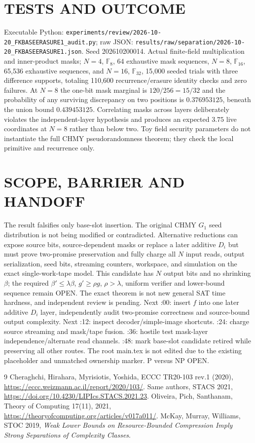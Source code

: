 \documentclass[11pt]{article}
\begin{document}
\section*{TESTS AND OUTCOME}
Executable Python: \texttt{experiments/review/2026-10-20\_FKBASEERASURE1\_audit.py}; raw JSON: \texttt{results/raw/separation/2026-10-20\_FKBASEERASURE1.json}. Seed 202610200014. Actual finite-field multiplication and inner-product masks; $N=4$, $\mathbb F_8$, 64 exhaustive mask sequences, $N=8$, $\mathbb F_{16}$, 65,536 exhaustive sequences, and $N=16$, $\mathbb F_{32}$, 15,000 seeded trials with three difference supports, totaling 110,600 recurrence/erasure identity checks and zero failures. At $N=8$ the one-bit mask marginal is $120/256=15/32$ and the probability of any surviving discrepancy on two positions is $0.376953125$, beneath the union bound $0.439453125$. Correlating masks across layers deliberately violates the independent-layer hypothesis and produces an expected $3.75$ live coordinates at $N=8$ rather than below two. Toy field security parameters do not instantiate the full CHMY pseudorandomness theorem; they check the local primitive and recurrence only.

\section*{SCOPE, BARRIER AND HANDOFF}
The result falsifies only base-slot insertion. The original CHMY $G_1$ seed distribution is not being modified or contradicted. Alternative reductions can expose source bits, source-dependent masks or replace a later additive $D_i$ but must prove two-promise preservation and fully charge all $N$ input reads, output serialization, seed bits, streaming counters, workspace, and simulation on the exact single-work-tape model. This candidate has $N$ output bits and no shrinking $\beta$; the required $\beta'\le\lambda\beta$, $g'\ge\rho g$, $\rho>\lambda$, uniform verifier and lower-bound sequence remain OPEN. The exact theorem is not new general SAT time hardness, and independent review is pending.
Next :00: insert $f$ into one later additive $D_i$ layer, independently audit two-promise correctness and source-bound output complexity. Next :12: inspect decoder/simple-image shortcuts. :24: charge source streaming and mask/tape fusion. :36: hostile test mask-layer independence/alternate read channels. :48: mark base-slot candidate retired while preserving all other routes. The root main.tex is not edited due to the existing placeholder and unmatched ownership marker. P versus NP OPEN.

\begin{thebibliography}{9}
 Cheraghchi, Hirahara, Myrisiotis, Yoshida, ECCC TR20-103 rev.1 (2020), \url{https://eccc.weizmann.ac.il/report/2020/103/}.
 Same authors, STACS 2021, \url{https://doi.org/10.4230/LIPIcs.STACS.2021.23}.
 Oliveira, Pich, Santhanam, Theory of Computing 17(11), 2021, \url{https://theoryofcomputing.org/articles/v017a011/}.
 McKay, Murray, Williams, STOC 2019, \emph{Weak Lower Bounds on Resource-Bounded Compression Imply Strong Separations of Complexity Classes}.
\end{thebibliography}
\end{document}
